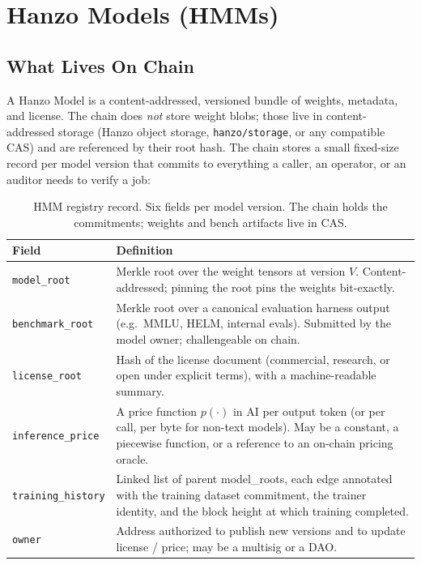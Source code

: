 \section{Hanzo Models (HMMs)}
\label{sec:hmm}

\subsection{What Lives On Chain}

A Hanzo Model is a content-addressed, versioned bundle of weights,
metadata, and license. The chain does \emph{not} store weight blobs;
those live in content-addressed storage (Hanzo object storage,
\texttt{hanzo/storage}, or any compatible CAS) and are referenced by
their root hash. The chain stores a small fixed-size record per model
version that commits to everything a caller, an operator, or an auditor
needs to verify a job:

\begin{table}[h]
\centering
\small
\begin{tabular}{lp{6.0cm}}
\toprule
\textbf{Field} & \textbf{Definition} \\
\midrule
\texttt{model\_root}      & Merkle root over the weight tensors at
                            version $V$. Content-addressed; pinning the
                            root pins the weights bit-exactly. \\
\texttt{benchmark\_root}  & Merkle root over a canonical evaluation
                            harness output (e.g.\ MMLU, HELM, internal
                            evals). Submitted by the model owner;
                            challengeable on chain. \\
\texttt{license\_root}    & Hash of the license document (commercial,
                            research, or open under explicit terms),
                            with a machine-readable summary. \\
\texttt{inference\_price} & A price function $p(\cdot)$ in AI per
                            output token (or per call, per byte for
                            non-text models). May be a constant, a
                            piecewise function, or a reference to an
                            on-chain pricing oracle. \\
\texttt{training\_history}& Linked list of parent model\_roots, each
                            edge annotated with the training dataset
                            commitment, the trainer identity, and the
                            block height at which training completed. \\
\texttt{owner}            & Address authorized to publish new versions
                            and to update license / price; may be a
                            multisig or a DAO. \\
\bottomrule
\end{tabular}
\caption{HMM registry record. Six fields per model version. The chain
holds the commitments; weights and bench artifacts live in CAS.}
\label{tab:hmm-record}
\end{table}


